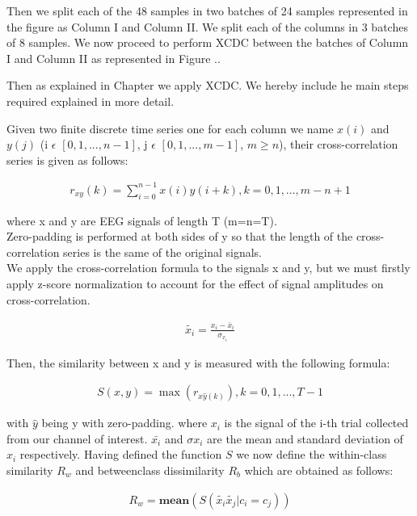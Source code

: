 \documentclass{Configuration_Files/PoliMi3i_thesis}
\begin{document}
Then we split each of the 48 samples in two batches of 24 samples represented in the figure as Column I and Column II.
We split each of the columns in 3 batches of 8 samples.
We now proceed to perform XCDC between the batches of Column I and Column II as represented in Figure ..

Then as explained in Chapter we apply XCDC.
We hereby include he main steps required explained in more detail.

Given two finite discrete time series one for each column we name $x(i)$ and $y(j)$
(i $\epsilon$ $[0, 1, . . . , n - 1]$, j $\epsilon$ $[0, 1, . . . , m - 1]$, $m \geq n$),
their cross-correlation series is given as follows:

\begin{align}
	 r_{xy}(k) = \sum_{i=0}^{n-1}x(i)y(i + k), k = 0,1,...,m-n+1
	\label{eq:XCDC1}
\end{align}

where x and y are EEG signals of length T (m=n=T). \\ 
Zero-padding is performed at both sides of y so that the length of the cross-correlation series is the same of the original signals. \\
We apply the cross-correlation formula to the signals x and y, but we must firstly apply z-score normalization to account for the effect of signal amplitudes on cross-correlation.

\begin{align}
	\tilde{x_i} = \frac{x_i - \bar x_i}{\sigma_{x_i}}
   \label{eq:XCDC3}
\end{align}


Then, the similarity between x and y is measured with the following formula:

\begin{align}
	S(x,y) = \max(r_{x\hat{y}(k)}), k=0,1,..., T - 1 
   \label{eq:XCDC2}
\end{align}

with $\hat{y}$ being y with zero-padding.
where $x_i$ is the signal of the i-th trial collected from our channel of interest. $\bar{x_i}$ and $\sigma{x_i}$ are
the mean and standard deviation of $x_i$ respectively.
Having defined the function $S$ we now define the within-class similarity $R_w$ and betweenclass dissimilarity $R_b$ which are obtained as follows:

\begin{align}
	R_w = \mathbf{mean}(S(\tilde{x_i}\tilde{x_j}| c_i = c_j))
   \label{eq:XCDC4}
\end{align}
\end{document}
